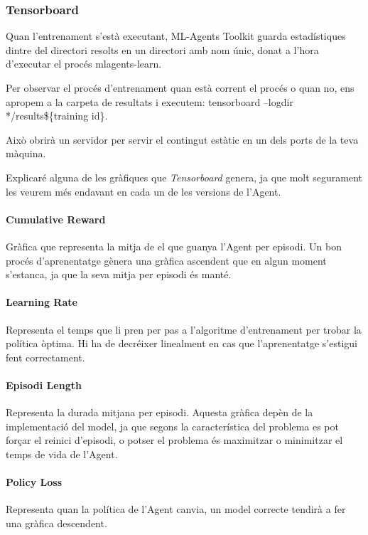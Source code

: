 \documentclass{article}
\begin{document}
    \newpage
    
    \subsubsection{Tensorboard}
    Quan l'entrenament s'està executant, ML-Agents Toolkit guarda estadístiques dintre del directori resolts en un directori amb nom únic, donat a l'hora d'executar el procés mlagents-learn.

    Per observar el procés d'entrenament quan està corrent el procés o quan no, ens apropem a la carpeta de resultats i executem: tensorboard –logdir */results\$\{training id\}.
    
    Això obrirà un servidor per servir el contingut estàtic en un dels ports de la teva màquina.
    
    Explicaré alguna de les gràfiques que \textit{Tensorboard} genera, ja que molt segurament les veurem més endavant en cada un de les versions de l'Agent.
    
    \paragraph{Cumulative Reward}
    Gràfica que representa la mitja de el que guanya l'Agent per episodi. Un bon procés d'aprenentatge gènera una gràfica ascendent que en algun moment s'estanca, ja que la seva mitja per episodi és manté.
    
    \paragraph{Learning Rate}
      Representa el temps que li pren per pas a l'algoritme d'entrenament per trobar la política òptima. Hi ha de decréixer linealment en cas que l'aprenentatge s'estigui fent correctament.
        
    \paragraph{Episodi Length}
    Representa la durada mitjana per episodi. Aquesta gràfica depèn de la implementació del model, ja que segons la característica del problema es pot forçar el reinici d'episodi, o potser el problema és maximitzar o minimitzar el temps de vida de l'Agent.
    
    \paragraph{Policy Loss}
    Representa quan la política de l'Agent canvia, un model correcte tendirà a fer una gràfica descendent.
    
\end{document}
